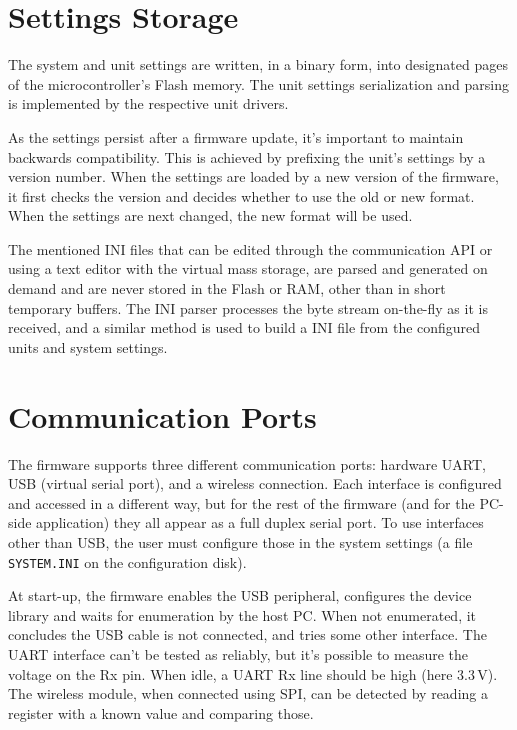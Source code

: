 
\section{Settings Storage}

The system and unit settings are written, in a binary form, into designated pages of the microcontroller's Flash memory. The unit settings serialization and parsing is implemented by the respective unit drivers.

As the settings persist after a firmware update, it's important to maintain backwards compatibility. This is achieved by prefixing the unit's settings by a version number. When the settings are loaded by a new version of the firmware, it first checks the version and decides whether to use the old or new format. When the settings are next changed, the new format will be used.

The mentioned INI files that can be edited through the communication API or using a text editor with the virtual mass storage, are parsed and generated on demand and are never stored in the Flash or RAM, other than in short temporary buffers. The INI parser processes the byte stream on-the-fly as it is received, and a similar method is used to build a INI file from the configured units and system settings.


\section{Communication Ports}

The firmware supports three different communication ports: hardware UART, USB (virtual serial port), and a wireless connection. Each interface is configured and accessed in a different way, but for the rest of the firmware (and for the PC-side application) they all appear as a full duplex serial port. To use interfaces other than USB, the user must configure those in the system settings (a file \verb|SYSTEM.INI| on the configuration disk).

At start-up, the firmware enables the USB peripheral, configures the device library and waits for enumeration by the host PC. When not enumerated, it concludes the USB cable is not connected, and tries some other interface. The UART interface can't be tested as reliably, but it's possible to measure the voltage on the Rx pin. When idle, a UART Rx line should be high (here 3.3\,V). The wireless module, when connected using SPI, can be detected by reading a register with a known value and comparing those.

